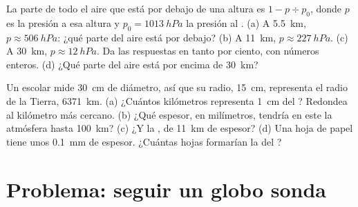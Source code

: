 \begin{exercise}[$\star\star\star$]\label{exo:g8:the-atmosphere:11}
La parte de todo el aire que está por debajo de una altura es $1 - p \div
p_0$, donde $p$ es la presión a esa altura y $p_0 =
\qty{1013}{hPa}$ la presión al . (a) A \qty{5.5}{km}, $p
\approx \qty{506}{hPa}$: ¿qué parte del aire está por debajo? (b) A
\qty{11}{km}, $p \approx \qty{227}{hPa}$. (c) A \qty{30}{km}, $p \approx
\qty{12}{hPa}$. Da las respuestas en tanto por ciento, con números enteros.
(d) ¿Qué parte del aire está por encima de \qty{30}{km}?
\end{exercise}

\begin{exercise}[$\star\star\star$]\label{exo:g8:the-atmosphere:12}
Un  escolar mide \qty{30}{cm} de diámetro, así que su radio,
\qty{15}{cm}, representa el radio de la Tierra, \qty{6371}{km}. (a) ¿Cuántos
kilómetros representa \qty{1}{cm} del ? Redondea al kilómetro más
cercano. (b) ¿Qué espesor, en milímetros, tendría en este  la
atmósfera hasta \qty{100}{km}? (c) ¿Y la , de \qty{11}{km} de
espesor? (d) Una hoja de papel tiene unos \qty{0.1}{mm} de espesor.
¿Cuántas hojas formarían la  del ?
\end{exercise}

\section{Problema: seguir un globo sonda}

